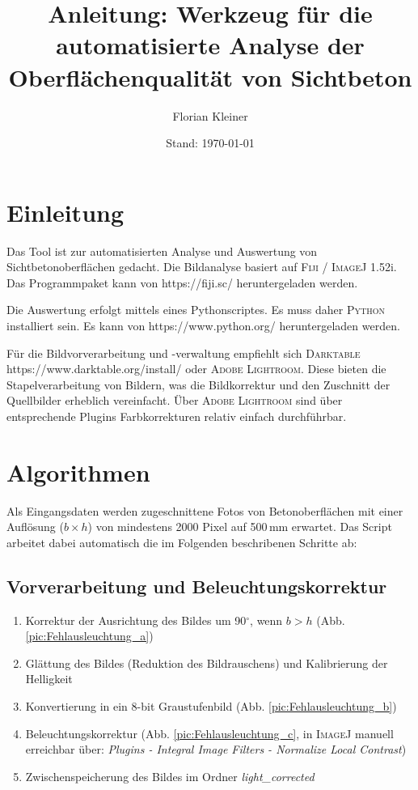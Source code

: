 \documentclass{article}
\title{Anleitung: Werkzeug für die automatisierte Analyse der Oberflächenqualität von Sichtbeton}
\author{Florian Kleiner}
\date{Stand: \today}
\begin{document}
\maketitle

\tableofcontents

\section{Einleitung}

Das Tool ist zur automatisierten Analyse und Auswertung von Sichtbetonoberflächen gedacht. Die Bildanalyse basiert auf \textsc{Fiji / ImageJ} 1.52i. Das Programmpaket kann von https://fiji.sc/ heruntergeladen werden. 

Die Auswertung erfolgt mittels eines Pythonscriptes. Es muss daher \textsc{Python} installiert sein. Es kann von https://www.python.org/ heruntergeladen werden. 

Für die Bildvorverarbeitung und -verwaltung empfiehlt sich \textsc{Darktable} https://www.darktable.org/install/ oder \textsc{Adobe Lightroom}. Diese bieten die Stapelverarbeitung von Bildern, was die Bildkorrektur und den Zuschnitt der Quellbilder erheblich vereinfacht. Über \textsc{Adobe Lightroom} sind über entsprechende Plugins Farbkorrekturen relativ einfach durchführbar.

\section{Algorithmen}
\label{sec:Algorithmus}

Als Eingangsdaten werden zugeschnittene Fotos von Betonoberflächen mit einer Auflösung ($b \times h$) von mindestens 2000 Pixel auf 500\,mm erwartet.
Das Script arbeitet dabei automatisch die im Folgenden beschribenen Schritte ab:

\subsection{Vorverarbeitung und Beleuchtungskorrektur}

\begin{enumerate}
	\item Korrektur der Ausrichtung des Bildes um 90$^\circ$, wenn $b > h$ (Abb. \ref{pic:Fehlausleuchtung_a})
	\item Glättung des Bildes (Reduktion des Bildrauschens) und Kalibrierung der Helligkeit
	\item Konvertierung in ein 8-bit Graustufenbild (Abb. \ref{pic:Fehlausleuchtung_b})
	\item Beleuchtungskorrektur (Abb. \ref{pic:Fehlausleuchtung_c}, in \textsc{ImageJ} manuell erreichbar über: \textit{Plugins - Integral Image Filters - Normalize Local Contrast})
	\item Zwischenspeicherung des Bildes im Ordner \textit{light\_corrected}
\end{enumerate}
\end{document}
